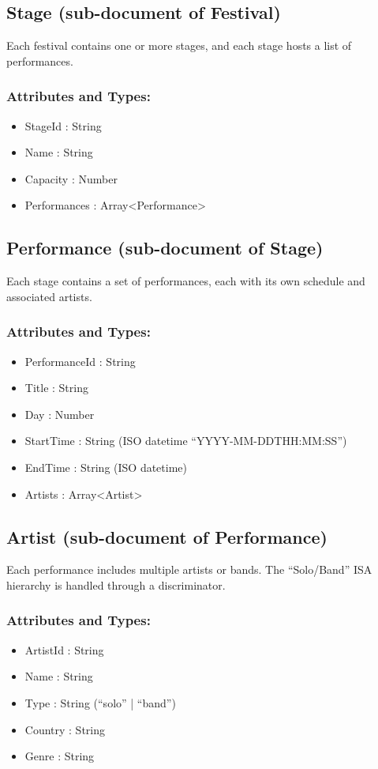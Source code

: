 \documentclass[11pt,a4paper]{report}
\begin{document}
\subsection{Stage (sub-document of Festival)}
Each festival contains one or more stages, and each stage hosts a list of performances.

\subsubsection{Attributes and Types:}

\begin{itemize}
    \item StageId : String
    \item Name : String
    \item Capacity : Number
    \item Performances : Array<Performance>
\end{itemize}

\subsection{Performance (sub-document of Stage)}

Each stage contains a set of performances, each with its own schedule and associated artists.

\subsubsection{Attributes and Types:}
\begin{itemize}
    \item PerformanceId : String
    \item Title : String
    \item Day : Number
    \item StartTime : String (ISO datetime “YYYY-MM-DDTHH:MM:SS”)
    \item EndTime : String (ISO datetime)
    \item Artists : Array<Artist>
\end{itemize}

\subsection{Artist (sub-document of Performance)}
Each performance includes multiple artists or bands. The “Solo/Band” ISA hierarchy is handled through a discriminator.

\subsubsection{Attributes and Types:}
\begin{itemize}
    \item ArtistId : String
    \item Name : String
    \item Type : String (“solo” | “band”)
    \item Country : String
    \item Genre : String
\end{itemize}
\end{document}
